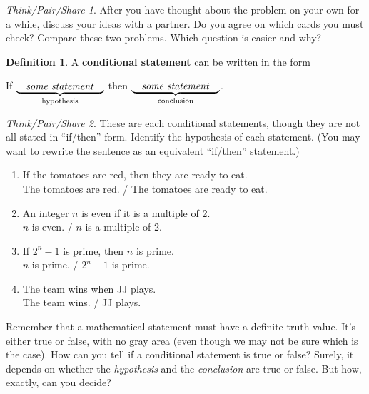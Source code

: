 \documentclass[10pt, reqno]{amsart}
\theoremstyle{remark}
\newtheorem*{thinkpair*}{Think/Pair/Share}
\theoremstyle{definition}
\newtheorem{define}[thm]{Definition}
\numberwithin{equation}{section}  %
\begin{document}
\begin{thinkpair*}
After you have thought about the problem on your own for a while, discuss your ideas with a partner.  Do you agree on which cards you must check?   Compare these two problems.
Which question is easier and why?
\end{thinkpair*}

\begin{define}
A {\bf conditional statement} can be written in the form
\begin{center}
If $\underbrace{\quad \text{\emph{some statement}} \quad}_{\text{hypothesis}}$ then $\underbrace{\quad \text{\emph{some statement}}  \quad}_{\text{conclusion}}$.
\end{center}
\end{define}

\begin{thinkpair*}
 These are each conditional statements, though they are not all stated in ``if/then'' form.  Identify the hypothesis of each statement.  (You may want to rewrite the sentence as an equivalent ``if/then'' statement.)
 \vspace{.2in}

 \begin{enumerate}
\item 
If the tomatoes are red, then they are ready to eat.\\
The tomatoes are red. \qquad / \qquad The tomatoes are ready to eat.


\item
An integer $n$ is even if it is a multiple of 2.\\
$n$ is even. \qquad / \qquad $n$ is a multiple of 2.



\item
If $2^n - 1$ is prime, then $n$ is prime.\\
$n$ is prime. \qquad / \qquad $2^n-1$ is prime.



\item
The team wins when JJ plays.\\
The team wins. \qquad / \qquad JJ plays.


\end{enumerate}
\end{thinkpair*}

Remember that a mathematical statement must have a definite truth value.  It's either true or false, with no gray area (even though we may not be sure which is the case).  How can you tell if a conditional statement is true or false?  Surely, it depends on whether the \emph{hypothesis} and the \emph{conclusion} are true or false.  But how, exactly, can you decide?
\end{document}
